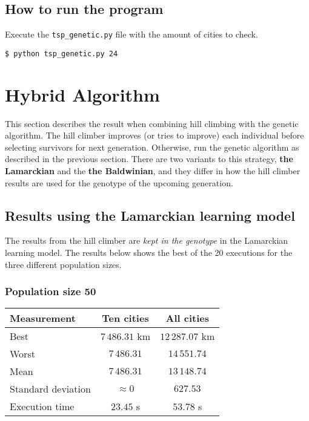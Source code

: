 \documentclass{article}
\begin{document}
\subsection*{How to run the program}

Execute the \texttt{tsp\_genetic.py} file with the amount of cities to check.

\begin{verbatim}
$ python tsp_genetic.py 24
\end{verbatim}

\section*{Hybrid Algorithm}

This section describes the result when combining hill climbing with the genetic algorithm. The hill climber improves (or tries to improve) each individual before selecting survivors for next generation. Otherwise, run the genetic algorithm as described in the previous section. There are two variants to this strategy, \textbf{the Lamarckian} and the \textbf{the Baldwinian}, and they differ in how the hill climber results are used for the genotype of the upcoming generation.

\subsection*{Results using the Lamarckian learning model}

The results from the hill climber are \textit{kept in the genotype} in the Lamarckian learning model. The results below shows the best of the 20 executions for the three different population sizes.

\subsubsection*{Population size 50}

\begin{center}
\begin{tabular}{lcc}
\toprule
Measurement & Ten cities & All cities \\
\midrule
Best & $7\,486.31$ km & $12\,287.07$ km \\
Worst & $7\,486.31$ & $14\,551.74$ \\
Mean & $7\,486.31$ & $13\,148.74$ \\
Standard deviation & $\approx 0$ & $627.53$ \\
Execution time & $23.45$ s & $53.78$ s \\
\bottomrule
\end{tabular}
\end{center}
\end{document}
